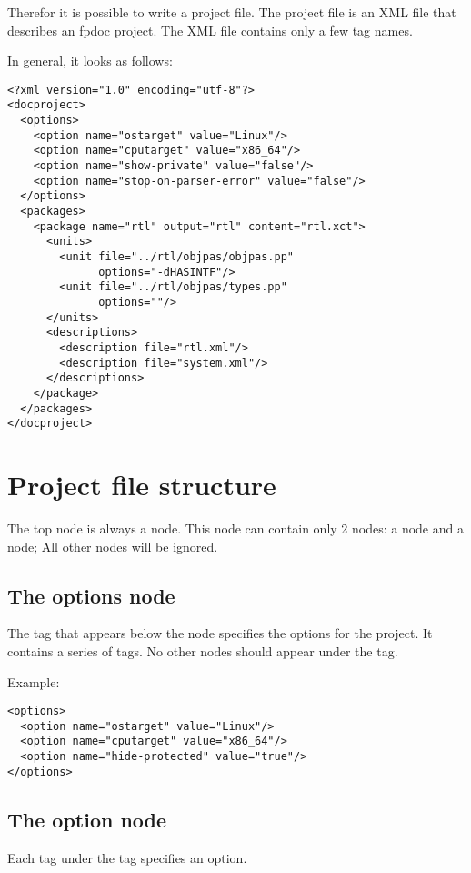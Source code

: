 Therefor it is possible to write a project file. The project file is
an XML file that describes an fpdoc project. The XML file contains only 
a few tag names. 

In general, it looks as follows:

\begin{verbatim}
<?xml version="1.0" encoding="utf-8"?>
<docproject>
  <options>
    <option name="ostarget" value="Linux"/>
    <option name="cputarget" value="x86_64"/>
    <option name="show-private" value="false"/>
    <option name="stop-on-parser-error" value="false"/>
  </options>
  <packages>
    <package name="rtl" output="rtl" content="rtl.xct">
      <units>
        <unit file="../rtl/objpas/objpas.pp" 
              options="-dHASINTF"/>
        <unit file="../rtl/objpas/types.pp" 
              options=""/>
      </units>
      <descriptions>
        <description file="rtl.xml"/>
        <description file="system.xml"/>
      </descriptions>
    </package>
  </packages>
</docproject>
\end{verbatim}

\section{Project file structure}

The top node is always a  node. This node can contain only
2 nodes: a  node and a  node; All other nodes
will be ignored.

\subsection{The options node}
\label{project:options}
The  tag that appears below the  node specifies
the options for the \fpdoc project. It contains a series of  tags. 
No other nodes should appear under the  tag.

Example:
\begin{verbatim}
<options>
  <option name="ostarget" value="Linux"/>
  <option name="cputarget" value="x86_64"/>
  <option name="hide-protected" value="true"/>
</options>
\end{verbatim}

\subsection{The option node}
\label{project:option}
Each  tag under the  tag specifies an option.

